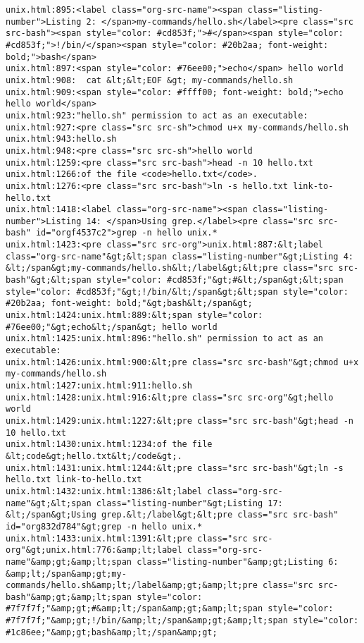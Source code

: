 \documentclass[11pt]{article}
\begin{document}
\begin{verbatim}
unix.html:895:<label class="org-src-name"><span class="listing-number">Listing 2: </span>my-commands/hello.sh</label><pre class="src src-bash"><span style="color: #cd853f;">#</span><span style="color: #cd853f;">!/bin/</span><span style="color: #20b2aa; font-weight: bold;">bash</span>
unix.html:897:<span style="color: #76ee00;">echo</span> hello world
unix.html:908:  cat &lt;&lt;EOF &gt; my-commands/hello.sh
unix.html:909:<span style="color: #ffff00; font-weight: bold;">echo hello world</span>
unix.html:923:"hello.sh" permission to act as an executable:
unix.html:927:<pre class="src src-sh">chmod u+x my-commands/hello.sh
unix.html:943:hello.sh
unix.html:948:<pre class="src src-sh">hello world
unix.html:1259:<pre class="src src-bash">head -n 10 hello.txt
unix.html:1266:of the file <code>hello.txt</code>.
unix.html:1276:<pre class="src src-bash">ln -s hello.txt link-to-hello.txt
unix.html:1418:<label class="org-src-name"><span class="listing-number">Listing 14: </span>Using grep.</label><pre class="src src-bash" id="orgf4537c2">grep -n hello unix.*
unix.html:1423:<pre class="src src-org">unix.html:887:&lt;label class="org-src-name"&gt;&lt;span class="listing-number"&gt;Listing 4: &lt;/span&gt;my-commands/hello.sh&lt;/label&gt;&lt;pre class="src src-bash"&gt;&lt;span style="color: #cd853f;"&gt;#&lt;/span&gt;&lt;span style="color: #cd853f;"&gt;!/bin/&lt;/span&gt;&lt;span style="color: #20b2aa; font-weight: bold;"&gt;bash&lt;/span&gt;
unix.html:1424:unix.html:889:&lt;span style="color: #76ee00;"&gt;echo&lt;/span&gt; hello world
unix.html:1425:unix.html:896:"hello.sh" permission to act as an executable:
unix.html:1426:unix.html:900:&lt;pre class="src src-bash"&gt;chmod u+x my-commands/hello.sh
unix.html:1427:unix.html:911:hello.sh
unix.html:1428:unix.html:916:&lt;pre class="src src-org"&gt;hello world
unix.html:1429:unix.html:1227:&lt;pre class="src src-bash"&gt;head -n 10 hello.txt
unix.html:1430:unix.html:1234:of the file &lt;code&gt;hello.txt&lt;/code&gt;.
unix.html:1431:unix.html:1244:&lt;pre class="src src-bash"&gt;ln -s hello.txt link-to-hello.txt
unix.html:1432:unix.html:1386:&lt;label class="org-src-name"&gt;&lt;span class="listing-number"&gt;Listing 17: &lt;/span&gt;Using grep.&lt;/label&gt;&lt;pre class="src src-bash" id="org832d784"&gt;grep -n hello unix.*
unix.html:1433:unix.html:1391:&lt;pre class="src src-org"&gt;unix.html:776:&amp;lt;label class="org-src-name"&amp;gt;&amp;lt;span class="listing-number"&amp;gt;Listing 6: &amp;lt;/span&amp;gt;my-commands/hello.sh&amp;lt;/label&amp;gt;&amp;lt;pre class="src src-bash"&amp;gt;&amp;lt;span style="color: #7f7f7f;"&amp;gt;#&amp;lt;/span&amp;gt;&amp;lt;span style="color: #7f7f7f;"&amp;gt;!/bin/&amp;lt;/span&amp;gt;&amp;lt;span style="color: #1c86ee;"&amp;gt;bash&amp;lt;/span&amp;gt;

\end{verbatim}
\end{document}
